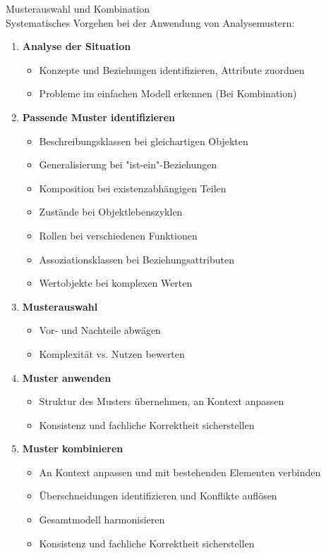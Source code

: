 \begin{KR}{Musterauswahl und Kombination}\\
Systematisches Vorgehen bei der Anwendung von Analysemustern:
\begin{enumerate}
    \item \textbf{Analyse der Situation}
    \begin{itemize}
        \item Konzepte und Beziehungen identifizieren, Attribute zuordnen
        \item Probleme im einfachen Modell erkennen (Bei Kombination)
    \end{itemize}

    \item \textbf{Passende Muster identifizieren}
    \begin{itemize}
        \item Beschreibungsklassen bei gleichartigen Objekten
        \item Generalisierung bei "ist-ein"-Beziehungen
        \item Komposition bei existenzabhängigen Teilen
        \item Zustände bei Objektlebenszyklen
        \item Rollen bei verschiedenen Funktionen
        \item Assoziationsklassen bei Beziehungsattributen
        \item Wertobjekte bei komplexen Werten
    \end{itemize}

    \item \textbf{Musterauswahl}
    \begin{itemize}
        \item Vor- und Nachteile abwägen 
        \item Komplexität vs. Nutzen bewerten
    \end{itemize}
    
    \item \textbf{Muster anwenden}
    \begin{itemize}
        \item Struktur des Musters übernehmen, an Kontext anpassen
        \item Konsistenz und fachliche Korrektheit sicherstellen
    \end{itemize}
    
    \item \textbf{Muster kombinieren}
    \begin{itemize}
        \item An Kontext anpassen und mit bestehenden Elementen verbinden
        \item Überschneidungen identifizieren und Konflikte auflösen
        \item Gesamtmodell harmonisieren
        \item Konsistenz und fachliche Korrektheit sicherstellen
    \end{itemize}
\end{enumerate}
\end{KR}


